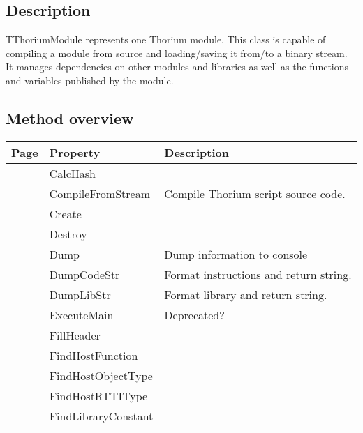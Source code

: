 \subsection{Description}
TThoriumModule represents one Thorium module. This class is capable of compiling a module from source and loading/saving it from/to a binary stream. It manages dependencies on other modules and libraries as well as the functions and variables published by the module.%
\subsection{Method overview}
\label{thoriumcorepkg:thorium:tthoriummodule:methods}
\begin{tabularx}{\textwidth}{llX}
Page & Property & Description  \\ \hline
\pageref{thoriumcorepkg:thorium:tthoriummodule:calchash} & CalcHash  &  \\
\pageref{thoriumcorepkg:thorium:tthoriummodule:compilefromstream} & CompileFromStream  & Compile Thorium script source code. \\
\pageref{thoriumcorepkg:thorium:tthoriummodule:create} & Create  &  \\
\pageref{thoriumcorepkg:thorium:tthoriummodule:destroy} & Destroy  &  \\
\pageref{thoriumcorepkg:thorium:tthoriummodule:dump} & Dump  & Dump information to console \\
\pageref{thoriumcorepkg:thorium:tthoriummodule:dumpcodestr} & DumpCodeStr  & Format instructions and return string. \\
\pageref{thoriumcorepkg:thorium:tthoriummodule:dumplibstr} & DumpLibStr  & Format library and return string. \\
\pageref{thoriumcorepkg:thorium:tthoriummodule:executemain} & ExecuteMain  & Deprecated? \\
\pageref{thoriumcorepkg:thorium:tthoriummodule:fillheader} & FillHeader  &  \\
\pageref{thoriumcorepkg:thorium:tthoriummodule:findhostfunction} & FindHostFunction  &  \\
\pageref{thoriumcorepkg:thorium:tthoriummodule:findhostobjecttype} & FindHostObjectType  &  \\
\pageref{thoriumcorepkg:thorium:tthoriummodule:findhostrttitype} & FindHostRTTIType  &  \\
\pageref{thoriumcorepkg:thorium:tthoriummodule:findlibraryconstant} & FindLibraryConstant  &  \\

\end{tabularx}
